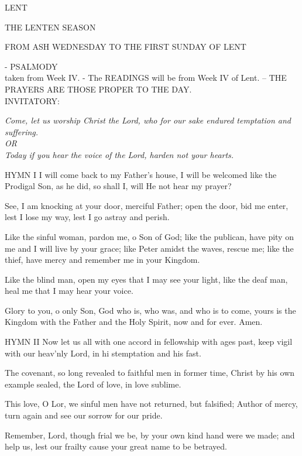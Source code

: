 LENT

THE LENTEN SEASON
	\begin{center}
\normalsize FROM ASH WEDNESDAY TO THE FIRST SUNDAY OF LENT
	\end{center}
- \noindent\small{\uppercase{Psalmody}\\} taken from Week IV.
- The READINGS will be from Week IV of Lent.
\uppercase{-- The prayers are those proper to the day.}\vspace{0.5em}\\

\small{\uppercase{INVITATORY:}}\normalsize
\begin{center}
\textit{Come, let us worship Christ the Lord, who for our sake endured temptation and suffering.\\}
\textit{OR\\}
\textit{Today if you hear the voice of the Lord, harden not your hearts.\\}
\end{center}
HYMN I
I will come back to my Father's house,
I will be welcomed like the Prodigal Son,
as he did, so shall I,
will He not hear my prayer?

See, I am knocking at your door, merciful Father;
open the door, bid me enter,
lest I lose my way,
lest I go astray and perish.

Like the sinful woman, pardon me, o Son of God;
like the publican, have pity on me and I will live by your grace;
like Peter amidst the waves, rescue me;
like the thief, have mercy and remember me in your Kingdom.

Like the blind man, open my eyes
that I may see your light,
like the deaf man,  heal me
that I may hear your voice.

Glory to you, o only Son,
God who is, who was, and who is to come,
yours is the Kingdom with the Father and the Holy Spirit,
now and for ever. Amen.

HYMN II
Now let us all with one accord
in fellowship with ages past,
keep vigil with our heav'nly Lord,
in hi stemptation and his fast.

The covenant, so long revealed 
to faithful men in former time,
Christ by his own example sealed,
the Lord of love, in love sublime.

This love, O Lor, we sinful men
have not returned, but falsified;
Author of mercy, turn again
and see our sorrow for our pride.

Remember, Lord, though frial we be,
by your own kind hand were we made;
and help us, lest our frailty
cause your great name to be betrayed.

